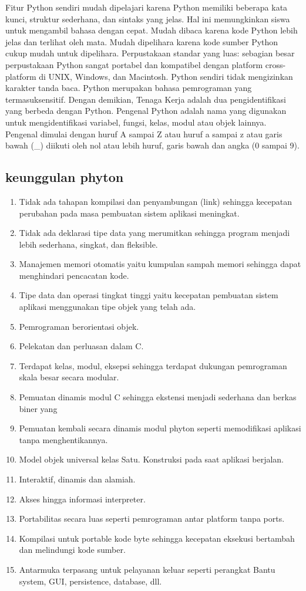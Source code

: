 Fitur Python sendiri mudah dipelajari karena Python memiliki beberapa kata kunci, struktur sederhana, dan sintaks yang jelas. Hal ini memungkinkan siswa untuk mengambil bahasa dengan cepat. Mudah dibaca karena kode Python lebih jelas dan terlihat oleh mata. Mudah dipelihara karena kode sumber Python cukup mudah untuk dipelihara.
Perpustakaan standar yang luas: sebagian besar perpustakaan Python sangat portabel dan kompatibel dengan platform cross-platform di UNIX, Windows, dan Macintosh. 
Python sendiri tidak mengizinkan karakter tanda baca. Python merupakan  bahasa pemrograman yang termasuksensitif. Dengan demikian, Tenaga Kerja adalah dua pengidentifikasi yang berbeda dengan Python. Pengenal Python adalah nama yang digunakan untuk mengidentifikasi variabel, fungsi, kelas, modul atau objek lainnya. Pengenal dimulai dengan huruf A sampai Z atau huruf a sampai z atau garis bawah (_) diikuti oleh nol atau lebih huruf, garis bawah dan angka (0 sampai 9).

\subsection{keunggulan phyton}
\begin{enumerate}
    \item Tidak ada tahapan kompilasi dan penyambungan (link) sehingga kecepatan perubahan pada masa pembuatan sistem aplikasi                meningkat. 
    \item Tidak ada deklarasi tipe data yang merumitkan sehingga program menjadi lebih sederhana, singkat, dan fleksible. 
    \item Manajemen memori otomatis yaitu kumpulan sampah memori sehingga dapat menghindari pencacatan kode. 
    \item Tipe data dan operasi tingkat tinggi yaitu kecepatan pembuatan sistem aplikasi menggunakan tipe objek yang telah ada. 
    \item Pemrograman berorientasi objek. 
    \item Pelekatan dan perluasan dalam C.
    \item Terdapat kelas, modul, eksepsi sehingga terdapat dukungan pemrograman skala besar secara modular.
    \item Pemuatan dinamis modul C sehingga ekstensi menjadi sederhana dan berkas biner yang 
    \item Pemuatan kembali secara dinamis modul phyton seperti memodifikasi aplikasi tanpa menghentikannya. 
    \item Model objek universal kelas Satu. Konstruksi pada saat aplikasi berjalan. 
    \item Interaktif, dinamis dan alamiah.\item Akses hingga informasi interpreter. 
    \item Portabilitas secara luas seperti pemrograman antar platform tanpa ports.
    \item Kompilasi untuk portable kode byte sehingga kecepatan eksekusi bertambah dan melindungi kode sumber. 
    \item Antarmuka terpasang untuk pelayanan keluar seperti perangkat Bantu system, GUI, persistence, database, dll. 
\end{enumerate}

